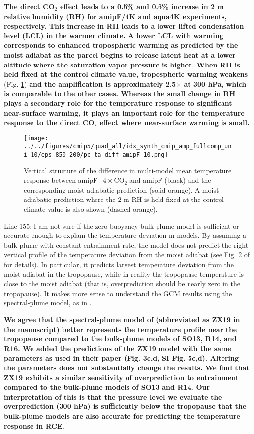 \documentclass[11pt]{article}
\begin{document}
\textbf{The direct CO\(_2\) effect leads to a 0.5\% and 0.6\% increase in 2 m relative humidity (RH) for amipF/4K and aqua4K experiments, respectively. This increase in RH leads to a lower lifted condensation level (LCL) in the warmer climate. A lower LCL with warming corresponds to enhanced tropospheric warming as predicted by the moist adiabat as the parcel begins to release latent heat at a lower altitude where the saturation vapor pressure is higher. When RH is held fixed at the control climate value, tropospheric warming weakens }(Fig. \ref{fig:orgf84709b})\textbf{ and the amplification is approximately 2.5\(\times\) at 300 hPa, which is comparable to the other cases. Whereas the small change in RH plays a secondary role for the temperature response to significant near-surface warming, it plays an important role for the temperature response to the direct CO\(_2\) effect where near-surface warming is small.}

\begin{figure}[htbp]
\centering
\texttt{[image: ../../figures/cmip5/quad\_all/idx\_synth\_cmip\_amp\_fullcomp\_uni\_10/eps\_850\_200/pc\_ta\_diff\_amipF\_10.png]}
\caption{\label{fig:orgf84709b}Vertical structure of the difference in multi-model mean temperature response between amipF\(+4\times\)CO\(_2\) and amipF (black) and the corresponding moist adiabatic prediction (solid orange). A moist adiabatic prediction where the 2 m RH is held fixed at the control climate value is also shown (dashed orange).}
\end{figure}

Line 155: I am not sure if the zero-buoyancy bulk-plume model is sufficient or accurate enough to explain the temperature deviation in models. By assuming a bulk-plume with constant entrainment rate, the model does not predict the right vertical profile of the temperature deviation from the moist adiabat (see Fig. 2 of \cite{zhou_conceptual_2019} for details). In particular, it predicts largest temperature deviation from the moist adiabat in the tropopause, while in reality the tropopause temperature is close to the moist adiabat (that is, overprediction should be nearly zero in the tropopause). It makes more sense to understand the GCM results using the spectral-plume model, as in \cite{zhou_conceptual_2019}.

\textbf{We agree that the spectral-plume model of} \cite{zhou_conceptual_2019} \textbf{(abbreviated as ZX19 in the manuscript) better represents the temperature profile near the tropopause compared to the bulk-plume models of SO13, R14, and R16. We added the predictions of the ZX19 model with the same parameters as used in their paper (Fig. 3c,d, SI Fig. 5c,d). Altering the parameters does not substantially change the results. We find that ZX19 exhibits a similar sensitivity of overprediction to entrainment compared to the bulk-plume models of SO13 and R14. Our interpretation of this is that the pressure level we evaluate the overprediction (300 hPa) is sufficiently below the tropopause that the bulk-plume models are also accurate for predicting the temperature response in RCE.}
\end{document}
